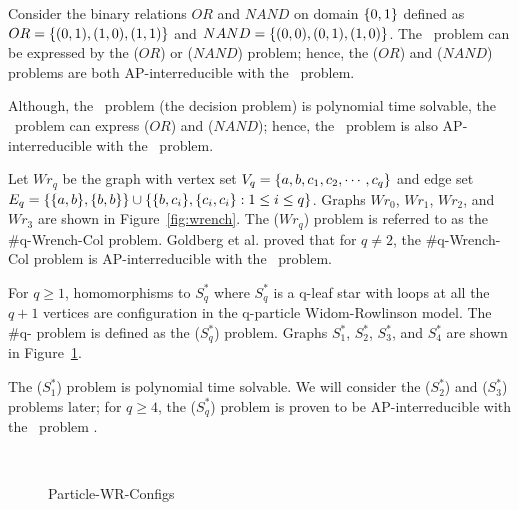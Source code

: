 \begin{example}
Consider the binary relations \(OR\) and \(NAND\) on domain \(\{{{0,1}}\}\) defined as
\(OR=\{{(0,1),(1,0),(1,1)}\}\) and \(NAND=\{{(0,0),(0,1),(1,0)}\}\)\@.
The \cis\ problem can be expressed by the \ccsp(\(OR\)) or \ccsp(\(NAND\)) problem;
hence, the \ccsp(\(OR\)) and \ccsp(\(NAND\)) problems are both AP-interreducible with the
\csat\ problem.

Although, the \dsat\ problem (the decision problem) is polynomial time
solvable, the \cdsat\ problem can express \ccsp(\(OR\)) and
\ccsp(\(NAND\)); hence, the \cdsat\ problem 
is also AP-interreducible with the \csat\ problem.
\end{example}

\begin{example} \label{exm:wrench}
Let \(Wr_q\) be the graph with vertex set \(V_q=\{{a,b,c_1,c_2,\cdots,c_q}\}\)
and edge set \(E_q=\{{\{{a,b}\},\{{b,b}\}}\} \cup 
\{{\{{b,c_i}\},\{{c_i,c_i}\}:1\le i\le q}\}\)\@.
Graphs \(Wr_0\), \(Wr_1\), \(Wr_2\), and \(Wr_3\) are shown in Figure~\ref{fig:wrench}.
The \chom(\(Wr_q\)) problem is referred to as the \#q-{\sc Wrench-Col} problem. 
Goldberg et al. \cite{Leslie03} proved that for \(q\neq 2\), the  \#q-{\sc Wrench-Col} problem
is AP-interreducible with the \csat\ problem.
\end{example}

\begin{example}  \label{exm:particles}
For \(q \ge 1\), homomorphisms to \(S^*_q\) where
\(S^*_q\) is a q-leaf star with loops at all the \(q+1\)
vertices are configuration in the q-particle Widom-Rowlinson model.
The \#q- problem is defined as the \chom(\(S^*_q\)) problem.
Graphs \(S^*_1\), \(S^*_2\), \(S^*_3\), and \(S^*_4\) are shown in Figure~\ref{fig:wrconfigs}.
 
The \chom(\(S^*_1\)) problem is polynomial time solvable.
We will consider the \chom(\(S^*_2\)) and \chom(\(S^*_3\)) problems later;
for \(q \ge 4\), the \chom(\(S^*_q\)) problem is proven to be AP-interreducible
with the \csat\ problem \cite{Leslie03}.
\end{example}

\begin{figure}[h]
\centering 
\subfigure[\ensuremath{S^*_1}]{\label{fig:ss1}}\hspace{5cm}
\subfigure[\ensuremath{S^*_2}]{\label{fig:ss2}}\\
\subfigure[\ensuremath{S^*_3}]{\label{fig:ss3}}\hspace{5cm}
\subfigure[\ensuremath{S^*_4}]{\label{fig:ss4}}
\caption{Particle-WR-Configs}
\label{fig:wrconfigs}
\end{figure}

